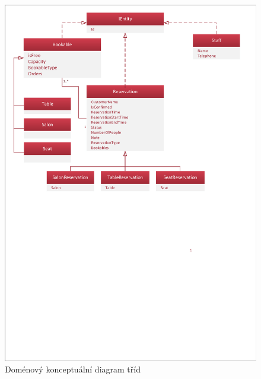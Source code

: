 \newpage
\begin{figure}[h!]
\begin{center}
\includegraphics[scale=0.75]{../02_Vysledne_modely/05_1_ConceptualClassDiagram.pdf}
\caption{Doménový konceptuální diagram tříd}
\label{fig:communication09-1}
\end{center}
\end{figure}






